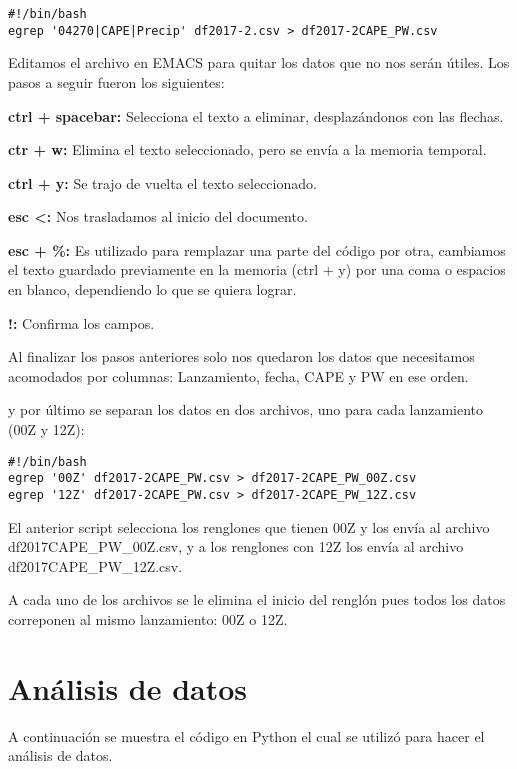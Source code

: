 \documentclass[12pt]{article}
\begin{document}
\begin{verbatim}
#!/bin/bash
egrep '04270|CAPE|Precip' df2017-2.csv > df2017-2CAPE_PW.csv
\end{verbatim}
Editamos el archivo en EMACS para quitar los datos que no nos serán útiles. Los pasos a seguir fueron los siguientes:

\textbf{ctrl + spacebar:} Selecciona el texto a eliminar, desplazándonos con las flechas.

\textbf{ctr + w:} Elimina el texto seleccionado, pero se envía a la memoria temporal.

\textbf{ctrl + y:} Se trajo de vuelta el texto seleccionado.

\textbf{esc <:} Nos trasladamos al inicio del documento.

\textbf{esc + \%:} Es utilizado para remplazar una parte del
código por otra, cambiamos el texto guardado previamente en la memoria (ctrl + y) por una coma o espacios en blanco, dependiendo  lo que se quiera lograr.

\textbf{!:} Confirma los campos.

Al finalizar los pasos anteriores solo nos quedaron los datos que necesitamos acomodados por columnas: Lanzamiento, fecha, CAPE y PW en ese orden.

y por último se separan los datos en dos archivos, uno para cada lanzamiento (00Z y 12Z):

\begin{verbatim}
#!/bin/bash
egrep '00Z' df2017-2CAPE_PW.csv > df2017-2CAPE_PW_00Z.csv
egrep '12Z' df2017-2CAPE_PW.csv > df2017-2CAPE_PW_12Z.csv
\end{verbatim}

El anterior script selecciona los renglones que tienen 00Z y los envía al archivo df2017CAPE\_PW\_00Z.csv, y a los renglones con 12Z los envía al archivo df2017CAPE\_PW\_12Z.csv.

A cada uno de los archivos se le elimina el inicio del renglón pues todos los datos correponen al mismo lanzamiento: 00Z o 12Z.

\section{Análisis de datos}

A continuación se muestra el código en Python el cual se utilizó para hacer el análisis de datos.
\end{document}
